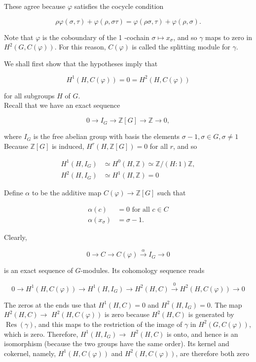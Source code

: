 \documentclass[10pt]{article}
\begin{document}
These agree because $\varphi$ satisfies the cocycle condition

$$
\rho \varphi(\sigma, \tau)+\varphi(\rho, \sigma \tau)=\varphi(\rho \sigma, \tau)+\varphi(\rho, \sigma) .
$$

Note that $\varphi$ is the coboundary of the 1 -cochain $\sigma \mapsto x_{\sigma}$, and so $\gamma$ maps to zero in $H^{2}(G, C(\varphi))$. For this reason, $C(\varphi)$ is called the splitting module for $\gamma$.

We shall first show that the hypotheses imply that

$$
H^{1}(H, C(\varphi))=0=H^{2}(H, C(\varphi))
$$

for all subgroups $H$ of $G$.\\
Recall that we have an exact sequence

$$
0 \rightarrow I_{G} \rightarrow \mathbb{Z}[G] \rightarrow \mathbb{Z} \rightarrow 0,
$$

where $I_{G}$ is the free abelian group with basis the elements $\sigma-1, \sigma \in G, \sigma \neq 1$ Because $\mathbb{Z}[G]$ is induced, $H^{r}(H, \mathbb{Z}[G])=0$ for all $r$, and so

$$
\begin{array}{ll}
H^{1}\left(H, I_{G}\right) & \simeq H^{0}(H, \mathbb{Z}) \simeq \mathbb{Z} /(H: 1) \mathbb{Z}, \\
H^{2}\left(H, I_{G}\right) & \simeq H^{1}(H, \mathbb{Z})=0
\end{array}
$$

Define $\alpha$ to be the additive map $C(\varphi) \rightarrow \mathbb{Z}[G]$ such that

$$
\begin{aligned}
\alpha(c) & =0 \text { for all } c \in C \\
\alpha\left(x_{\sigma}\right) & =\sigma-1 .
\end{aligned}
$$

Clearly,

$$
0 \rightarrow C \rightarrow C(\varphi) \xrightarrow{\alpha} I_{G} \rightarrow 0
$$

is an exact sequence of $G$-modules. Its cohomology sequence reads

$$
0 \rightarrow H^{1}(H, C(\varphi)) \rightarrow H^{1}\left(H, I_{G}\right) \rightarrow H^{2}(H, C) \xrightarrow{0} H^{2}(H, C(\varphi)) \rightarrow 0
$$

The zeros at the ends use that $H^{1}(H, C)=0$ and $H^{2}\left(H, I_{G}\right)=0$. The map $H^{2}(H, C) \rightarrow$ $H^{2}(H, C(\varphi))$ is zero because $H^{2}(H, C)$ is generated by $\operatorname{Res}(\gamma)$, and this maps to the restriction of the image of $\gamma$ in $H^{2}(G, C(\varphi))$, which is zero. Therefore, $H^{1}\left(H, I_{G}\right) \rightarrow$ $H^{2}(H, C)$ is onto, and hence is an isomorphism (because the two groups have the same order). Its kernel and cokernel, namely, $H^{1}(H, C(\varphi))$ and $H^{2}(H, C(\varphi))$, are therefore both zero
\end{document}
